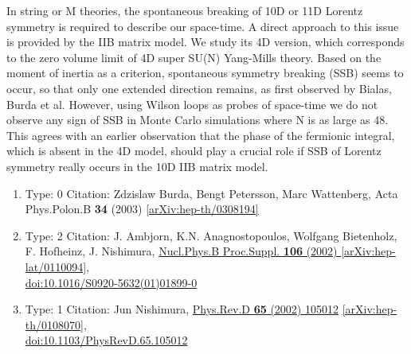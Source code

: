 \documentclass[a4paper,10pt]{article}
\begin{document}
\begin{enumerate}
In string or M theories, the spontaneous breaking of 10D or 11D Lorentz symmetry is required to describe our space-time. A direct approach to this issue is provided by the IIB matrix model. We study its 4D version, which corresponds to the zero volume limit of 4D super SU(N) Yang-Mills theory. Based on the moment of inertia as a criterion, spontaneous symmetry breaking (SSB) seems to occur, so that only one extended direction remains, as first observed by Bialas, Burda et al. However, using Wilson loops as probes of space-time we do not observe any sign of SSB in Monte Carlo simulations where N is as large as 48. This agrees with an earlier observation that the phase of the fermionic integral, which is absent in the 4D model, should play a crucial role if SSB of Lorentz symmetry really occurs in the 10D IIB matrix model.
\begin{enumerate}
  \item Type: 0 Citation: Zdzislaw Burda, Bengt Petersson, Marc Wattenberg, Acta Phys.Polon.B {\bf 34} (2003)   \href{https://arxiv.org/abs/hep-th/0308194}{[arXiv:hep-th/0308194]}
  \item Type: 2 Citation: J. Ambjorn, K.N. Anagnostopoulos, Wolfgang Bietenholz, F. Hofheinz, J. Nishimura, \href{https://www.doi.org/10.1016/S0920-5632(01)01899-0}{Nucl.Phys.B Proc.Suppl. {\bf 106} (2002) }  \href{https://arxiv.org/abs/hep-lat/0110094}{[arXiv:hep-lat/0110094]},\\\href{https://www.doi.org/10.1016/S0920-5632(01)01899-0}{doi:10.1016/S0920-5632(01)01899-0}
  \item Type: 1 Citation: Jun Nishimura, \href{https://www.doi.org/10.1103/PhysRevD.65.105012}{Phys.Rev.D {\bf 65} (2002) 105012}  \href{https://arxiv.org/abs/hep-th/0108070}{[arXiv:hep-th/0108070]},\\\href{https://www.doi.org/10.1103/PhysRevD.65.105012}{doi:10.1103/PhysRevD.65.105012}

\end{enumerate}
\end{enumerate}
\end{document}
